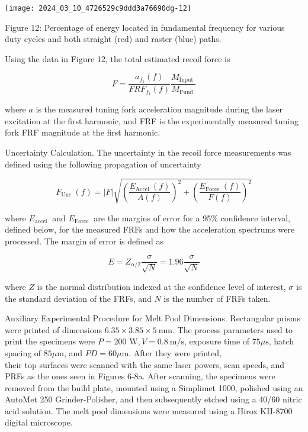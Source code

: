 \documentclass[10pt]{article}
\begin{document}
\begin{center}
\texttt{[image: 2024\_03\_10\_4726529c9ddd3a76690dg-12]}
\end{center}

Figure 12: Percentage of energy located in fundamental frequency for various duty cycles and both straight (red) and raster (blue) paths.

Using the data in Figure 12, the total estimated recoil force is


\begin{equation*}
F=\frac{a_{f_{1}}(f)}{F R F_{f_{1}}(f)} \frac{M_{\text {Input }}}{M_{\text {Fund }}} \tag{2}
\end{equation*}


where $a$ is the measured tuning fork acceleration magnitude during the laser excitation at the first harmonic, and FRF is the experimentally measured tuning fork FRF magnitude at the first harmonic.

Uncertainty Calculation. The uncertainty in the recoil force measurements was defined using the following propagation of uncertainty


\begin{equation*}
F_{\text {Unc }}(f)=|F| \sqrt{\left(\frac{E_{\text {Accel }}(f)}{A(f)}\right)^{2}+\left(\frac{E_{\text {Force }}(f)}{F(f)}\right)^{2}} \tag{3}
\end{equation*}


where $E_{\text {accel }}$ and $E_{\text {Force }}$ are the margins of error for a 95\% confidence interval, defined below, for the measured FRFs and how the acceleration spectrums were processed. The margin of error is defined as


\begin{equation*}
E=Z_{\alpha / 2} \frac{\sigma}{\sqrt{N}}=1.96 \frac{\sigma}{\sqrt{N}} \tag{4}
\end{equation*}


where $Z$ is the normal distribution indexed at the confidence level of interest, $\sigma$ is the standard deviation of the FRFs, and $N$ is the number of FRFs taken.

Auxiliary Experimental Procedure for Melt Pool Dimensions. Rectangular prisms were printed of dimensions $6.35 \times 3.85 \times 5 \mathrm{~mm}$. The process parameters used to print the specimens were $P=200$ $\mathrm{W}, V=0.8 \mathrm{~m} / \mathrm{s}$, exposure time of $75 \mu \mathrm{s}$, hatch spacing of $85 \mu \mathrm{m}$, and $P D=60 \mu \mathrm{m}$. After they were printed,\\
their top surfaces were scanned with the same laser powers, scan speeds, and PRFs as the ones seen in Figures 6-8a. After scanning, the specimens were removed from the build plate, mounted using a Simplimet 1000, polished using an AutoMet 250 Grinder-Polisher, and then subsequently etched using a 40/60 nitric acid solution. The melt pool dimensions were measured using a Hirox KH-8700 digital microscope.
\end{document}
